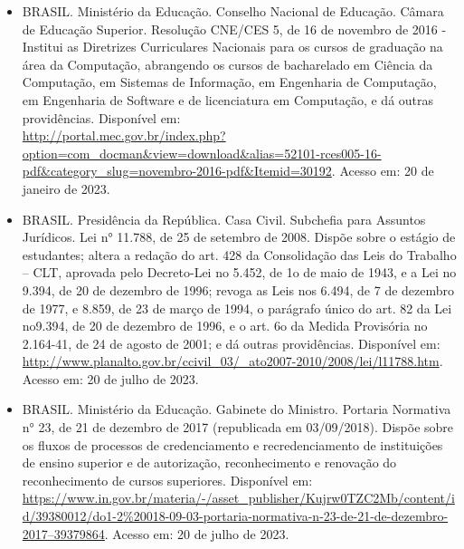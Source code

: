 \begin{itemize}
    \item BRASIL. Ministério da Educação. Conselho Nacional de Educação. Câmara
    de Educação Superior. Resolução CNE/CES 5, de 16 de novembro de 2016 -
    Institui as Diretrizes Curriculares Nacionais para os cursos de graduação
    na área da Computação, abrangendo os cursos de bacharelado em Ciência da
    Computação, em Sistemas de Informação, em Engenharia de Computação, em
    Engenharia de Software e de licenciatura em Computação, e dá outras
    providências. Disponível em:\\
    \href{http://portal.mec.gov.br/index.php?option=com_docman&view=download&alias=52101-rces005-16-pdf&category_slug=novembro-2016-pdf&Itemid=30192}{http://portal.mec.gov.br/index.php?option=com\_docman\&view=download\&alias=52101-rces005-16-pdf\&category\_slug=novembro-2016-pdf\&Itemid=30192}.
    Acesso em: 20 de janeiro de 2023.

    \item BRASIL. Presidência da República. Casa Civil. Subchefia para
    Assuntos Jurídicos. Lei n° 11.788, de 25 de setembro de
    2008. Dispõe sobre o estágio de estudantes; altera a redação do
    art. 428 da Consolidação das Leis do Trabalho – CLT, aprovada pelo
    Decreto-Lei no 5.452, de 1o de maio de 1943, e a Lei no 9.394, de
    20 de dezembro de 1996; revoga as Leis nos 6.494, de 7 de dezembro
    de 1977, e 8.859, de 23 de março de 1994, o parágrafo único do
    art. 82 da Lei no9.394, de 20 de dezembro de 1996, e o art. 6o da
    Medida Provisória no 2.164-41, de 24 de agosto de 2001; e dá
    outras providências. Disponível em:
    \url{http://www.planalto.gov.br/ccivil_03/_ato2007-2010/2008/lei/l11788.htm}.
    Acesso em: 20 de julho de 2023.

    \item BRASIL. Ministério da Educação. Gabinete do Ministro. Portaria
    Normativa n° 23, de 21 de dezembro de 2017 (republicada em
    03/09/2018). Dispõe sobre os fluxos de processos de credenciamento
    e recredenciamento de instituições de ensino superior e de
    autorização, reconhecimento e renovação do reconhecimento de
    cursos superiores. Disponível em:
    \href{https://www.in.gov.br/materia/-/asset_publisher/Kujrw0TZC2Mb/content/id/39380012/do1-2%20018-09-03-portaria-normativa-n-23-de-21-de-dezembro-2017--39379864}{https://www.in.gov.br/materia/-/asset\_publisher/Kujrw0TZC2Mb/content/id/39380012/do1-2\%20018-09-03-portaria-normativa-n-23-de-21-de-dezembro-2017--39379864}.
    Acesso em: 20 de julho de 2023.


\end{itemize}
